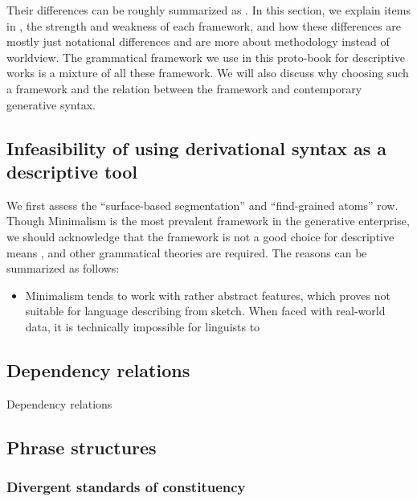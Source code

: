\documentclass[../main.tex]{subfiles}
\begin{document}
Their differences can be roughly summarized as . 
In this section, we explain items in , the strength and weakness 
of each framework, and how these differences
are mostly just notational differences and are more about methodology instead of worldview. The grammatical framework we use in this proto-book for 
descriptive works is a mixture of all these framework. We will also discuss why choosing such a 
framework and the relation between the framework and contemporary generative syntax.



\subsection{Infeasibility of using derivational syntax as a descriptive tool}\label{sec:generative-no-good}

We first assess the ``surface-based segmentation'' and ``find-grained atoms'' row. 
Though Minimalism is the most prevalent framework in the generative enterprise, we should acknowledge that 
the framework is not a good choice for descriptive means \citep{dryer2006descriptive}, and other grammatical
theories are required. The reasons can be summarized as follows:
\begin{itemize}
    \item Minimalism tends to work with rather abstract features, which proves not suitable for language 
    describing from sketch. When faced with real-world data, it is technically impossible for linguists 
    to 
\end{itemize}

\subsection{Dependency relations}

Dependency relations


\subsection{Phrase structures}

\subsubsection{Divergent standards of constituency}
\end{document}
